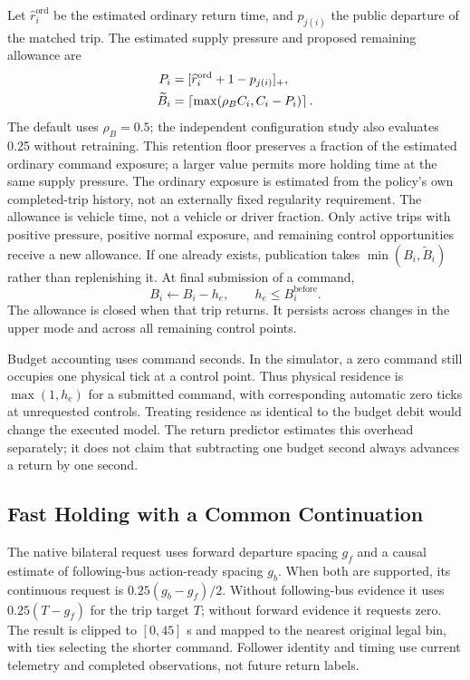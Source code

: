 Let $\widehat r_i^{\mathrm{ord}}$ be the estimated ordinary return time, and $p_{j(i)}$ the public departure of the matched trip. The estimated supply pressure and proposed remaining allowance are
\begin{align}
 P_i&=[\widehat r_i^{\mathrm{ord}}+1-p_{j(i)}]_+,\\
 \widetilde B_i&=\left\lceil\max(\rho_B C_i,C_i-P_i)\right\rceil.
 \label{eq:budget}
\end{align}
The default uses $\rho_B=0.5$; the independent configuration study also evaluates 0.25 without retraining. This retention floor preserves a fraction of the estimated ordinary command exposure; a larger value permits more holding time at the same supply pressure. The ordinary exposure is estimated from the policy's own completed-trip history, not an externally fixed regularity requirement. The allowance is vehicle time, not a vehicle or driver fraction. Only active trips with positive pressure, positive normal exposure, and remaining control opportunities receive a new allowance. If one already exists, publication takes $\min(B_i,\widetilde B_i)$ rather than replenishing it. At final submission of a command,
\begin{equation}
 B_i\leftarrow B_i-h_e,\qquad h_e\leq B_i^{\mathrm{before}}.
 \label{eq:debit}
\end{equation}
The allowance is closed when that trip returns. It persists across changes in the upper mode and across all remaining control points.

Budget accounting uses command seconds. In the simulator, a zero command still occupies one physical tick at a control point. Thus physical residence is $\max(1,h_e)$ for a submitted command, with corresponding automatic zero ticks at unrequested controls. Treating residence as identical to the budget debit would change the executed model. The return predictor estimates this overhead separately; it does not claim that subtracting one budget second always advances a return by one second.

\subsection{Fast Holding with a Common Continuation}
The native bilateral request uses forward departure spacing $g_f$ and a causal estimate of following-bus action-ready spacing $g_b$. When both are supported, its continuous request is $0.25(g_b-g_f)/2$. Without following-bus evidence it uses $0.25(T-g_f)$ for the trip target $T$; without forward evidence it requests zero. The result is clipped to $[0,45]$ s and mapped to the nearest original legal bin, with ties selecting the shorter command. Follower identity and timing use current telemetry and completed observations, not future return labels.

